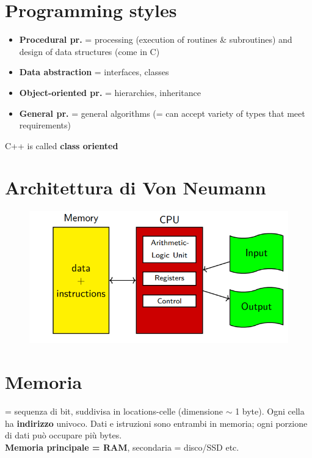 \documentclass[10pt, oneside]{book}
\begin{document}
\section{Programming styles}
\begin{itemize}
\item \textbf{Procedural pr.} = processing (execution of routines \& subroutines) and design of data structures (come in C)
\item \textbf{Data abstraction} = interfaces, classes
\item \textbf{Object-oriented pr.} = hierarchies, inheritance
\item \textbf{General pr.} = general algorithms (= can accept variety of types that meet requirements)
\end{itemize}
C++ is called \textbf{class oriented}


\section{Architettura di Von Neumann}
\begin{figure}[h!]
\centering
\includegraphics[scale=0.8]{von_neumann.png}
\end{figure}

\section{Memoria}
= sequenza di bit, suddivisa in locations-celle (dimensione $\sim$ 1 byte). Ogni cella ha \textbf{indirizzo} univoco. Dati e istruzioni sono entrambi in memoria; ogni porzione di dati può occupare più bytes.\\
\textbf{Memoria principale = RAM}, secondaria = disco/SSD etc.
\end{document}
